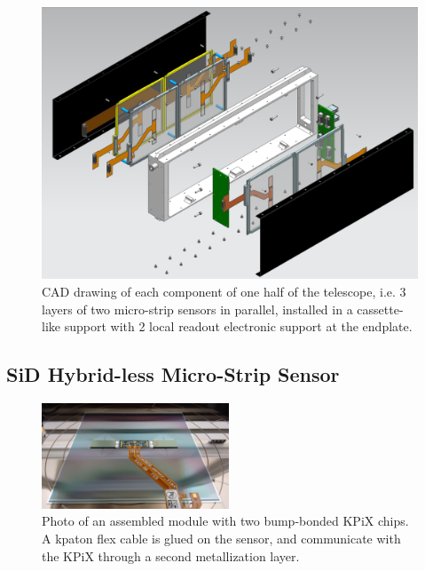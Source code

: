 \documentclass[conference]{IEEEtran}
\begin{document}
\begin{figure}[!ht]
\centering
\includegraphics[width=0.8\linewidth]{pics/Explosion.png}
\caption{CAD drawing of each component of one half of the telescope,
i.e. 3 layers of two micro-strip sensors in parallel,
installed in a cassette-like support with 2 local readout electronic support at the endplate.}
\label{fig:intro1}
\end{figure}

\subsection{SiD Hybrid-less Micro-Strip Sensor}

\begin{figure}[!t]
\centering
\includegraphics[width=2.2in]{pics/sensor_module1.jpg}
\caption{Photo of an assembled module with two bump-bonded KPiX chips.
A kpaton flex cable is glued on the sensor,
and communicate with the KPiX through a second metallization layer.}
\label{fig:sensor}
\end{figure}
\end{document}
